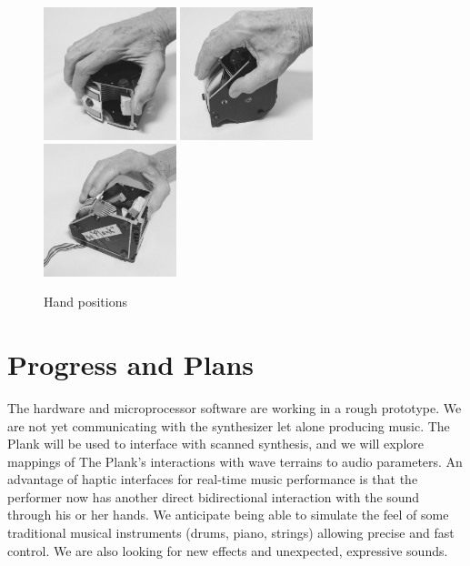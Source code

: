 \begin{figure}[ht]
\centering
\includegraphics[width=3.85cm]{Plank7a}
\includegraphics[width=3.85cm]{Plank7b}
\includegraphics[width=3.85cm]{Plank7c}
\caption{Hand positions}
\label{Verplank:fig:7}       %
\end{figure}

\section{Progress and Plans}

The hardware and microprocessor software are working in a rough prototype. We are not yet communicating with the synthesizer let alone producing music. The Plank will be used to interface with scanned synthesis, and we will explore mappings of The Plank's interactions with wave terrains to audio parameters. An advantage of haptic interfaces for real-time music performance is that the performer now has another direct bidirectional interaction with the sound through his or her hands. We anticipate being able to simulate the feel of some traditional musical instruments (drums, piano, strings) allowing precise and fast control. We are also looking for new effects and unexpected, expressive sounds.

